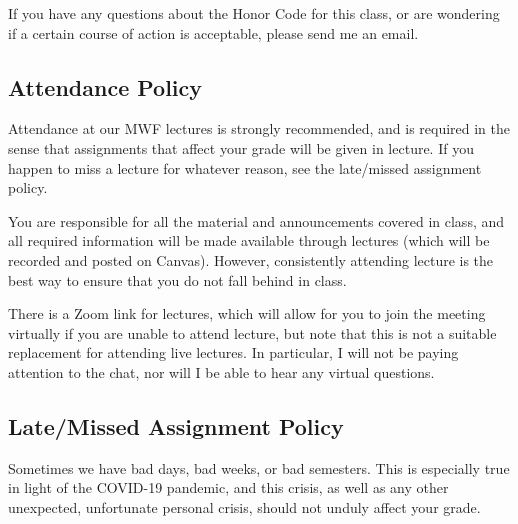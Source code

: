 \documentclass[11pt]{article}
\begin{document}
If you have any questions about the Honor Code for this class, or are wondering if a certain course of action is acceptable, please send me an email.


\subsection{Attendance Policy}

Attendance at our MWF lectures is strongly recommended, and is required in the sense that assignments that affect your grade will be given in lecture.  If you happen to miss a lecture for whatever reason, see the late/missed assignment policy.  

You are responsible for all the material and announcements covered in class, and all required information will be made available through lectures (which will be recorded and posted on Canvas).  However, consistently attending lecture is the best way to ensure that you do not fall behind in class.

There is a Zoom link for lectures, which will allow for you to join the meeting virtually if you are unable to attend lecture, but note that this is not a suitable replacement for attending live lectures. In particular, I will not be paying attention to the chat, nor will I be able to hear any virtual questions.

\subsection{Late/Missed Assignment Policy} Sometimes we have bad days, bad weeks, or bad semesters. This is especially true in light of the COVID-19 pandemic, and this crisis, as well as any other unexpected, unfortunate personal crisis, should not unduly affect your grade.  
\end{document}
